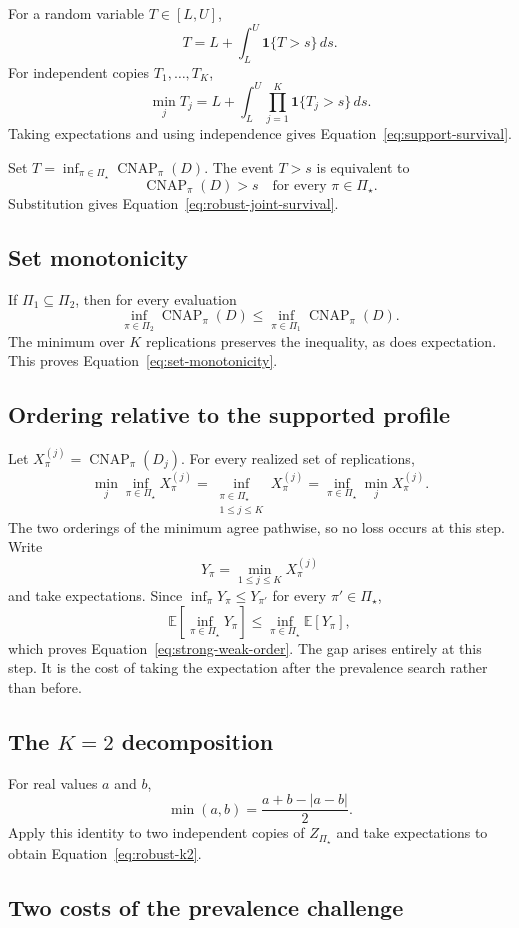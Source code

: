 \documentclass[11pt]{article}
\newcommand{\CNAP}{\operatorname{CNAP}}
\newcommand{\PSet}{\Pi_\star}
\newcommand{\E}{\mathbb{E}}
\theoremstyle{remark}
\begin{document}
For a random variable $T\in[L,U]$,
\[
T
=
L+\int_L^U\mathbf{1}\{T>s\}\,ds.
\]
For independent copies $T_1,\ldots,T_K$,
\[
\min_jT_j
=
L+
\int_L^U
\prod_{j=1}^{K}
\mathbf{1}\{T_j>s\}\,ds.
\]
Taking expectations and using independence gives Equation~\eqref{eq:support-survival}.

Set $T=\inf_{\pi\in\PSet}\CNAP_\pi(D)$. The event $T>s$ is equivalent to
\[
\CNAP_\pi(D)>s
\quad
\text{for every }\pi\in\PSet.
\]
Substitution gives Equation~\eqref{eq:robust-joint-survival}.

\subsection{Set monotonicity}

If $\Pi_1\subseteq\Pi_2$, then for every evaluation
\[
\inf_{\pi\in\Pi_2}\CNAP_\pi(D)
\leq
\inf_{\pi\in\Pi_1}\CNAP_\pi(D).
\]
The minimum over $K$ replications preserves the inequality, as does expectation. This proves Equation~\eqref{eq:set-monotonicity}.

\subsection{Ordering relative to the supported profile}

Let $X_\pi^{(j)}=\CNAP_\pi(D_j)$. For every realized set of replications,
\[
\min_j\inf_{\pi\in\PSet}X_\pi^{(j)}
=
\inf_{\substack{\pi\in\PSet\\1\leq j\leq K}}
X_\pi^{(j)}
=
\inf_{\pi\in\PSet}\min_jX_\pi^{(j)}.
\]
The two orderings of the minimum agree pathwise, so no loss occurs at this step. Write
\[
Y_\pi=\min_{1\leq j\leq K}X_\pi^{(j)}
\]
and take expectations. Since $\inf_\pi Y_\pi\leq Y_{\pi'}$ for every $\pi'\in\PSet$,
\[
\E\left[\inf_{\pi\in\PSet}Y_\pi\right]
\leq
\inf_{\pi\in\PSet}\E[Y_\pi],
\]
which proves Equation~\eqref{eq:strong-weak-order}. The gap arises entirely at this step. It is the cost of taking the expectation after the prevalence search rather than before.

\subsection{The $K=2$ decomposition}

For real values $a$ and $b$,
\[
\min(a,b)
=
\frac{a+b-|a-b|}{2}.
\]
Apply this identity to two independent copies of $Z_{\PSet}$ and take expectations to obtain Equation~\eqref{eq:robust-k2}.

\subsection{Two costs of the prevalence challenge}
\label{app:penalty}
\end{document}
